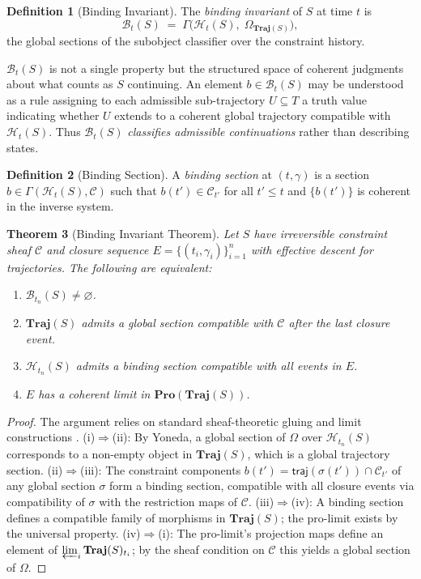\documentclass[11pt, letterpaper]{article}
\theoremstyle{plain}
\newtheorem{theorem}{Theorem}[section]
\theoremstyle{definition}
\newtheorem{definition}[theorem]{Definition}
\theoremstyle{remark}
\newcommand{\BI}{\mathcal{B}}
\newcommand{\CC}{\mathcal{C}}
\newcommand{\HH}{\mathcal{H}}
\newcommand{\traj}{\mathsf{traj}}
\begin{document}
\begin{definition}[Binding Invariant]
The \emph{binding invariant} of $S$ at time $t$ is
\[
  \BI_t(S) \;=\; \Gamma\!\bigl(\HH_t(S),\;\Omega_{\mathbf{Traj}(S)}\bigr),
\]
the global sections of the subobject classifier over the constraint history.
\end{definition}

$\BI_t(S)$ is not a single property but the structured space of coherent judgments
about what counts as $S$ continuing. An element $b \in \BI_t(S)$ may be understood
as a rule assigning to each admissible sub-trajectory $U \subseteq T$ a truth value
indicating whether $U$ extends to a coherent global trajectory compatible with
$\HH_t(S)$. Thus $\BI_t(S)$ \emph{classifies admissible continuations} rather than
describing states.

\begin{definition}[Binding Section]
A \emph{binding section} at $(t, \gamma)$ is a section
$b \in \Gamma(\HH_t(S), \CC)$ such that $b(t') \in \CC_{t'}$ for all $t' \leq t$
and $\{b(t')\}$ is coherent in the inverse system.
\end{definition}

\begin{theorem}[Binding Invariant Theorem]
\label{thm:bi}
Let $S$ have irreversible constraint sheaf $\CC$ and closure sequence
$E = \{(t_i, \gamma_i)\}_{i=1}^n$ with effective descent for trajectories. The
following are equivalent:
\begin{enumerate}[label=(\roman*), noitemsep]
  \item $\BI_{t_n}(S) \neq \varnothing$.
  \item $\mathbf{Traj}(S)$ admits a global section compatible with $\CC$ after the
    last closure event.
  \item $\HH_{t_n}(S)$ admits a binding section compatible with all events in $E$.
  \item $E$ has a coherent limit in $\mathbf{Pro}(\mathbf{Traj}(S))$.
\end{enumerate}
\end{theorem}

\begin{proof}
The argument relies on standard sheaf-theoretic gluing and limit constructions
\cite{maclane,riehl}. (i)$\Rightarrow$(ii): By Yoneda, a global section of $\Omega$
over $\HH_{t_n}(S)$ corresponds to a non-empty object in $\mathbf{Traj}(S)$, which is
a global trajectory section. (ii)$\Rightarrow$(iii): The constraint components
$b(t') = \traj(\sigma(t')) \cap \CC_{t'}$ of any global section $\sigma$ form a
binding section, compatible with all closure events via compatibility of $\sigma$ with
the restriction maps of $\CC$. (iii)$\Rightarrow$(iv): A binding section defines a
compatible family of morphisms in $\mathbf{Traj}(S)$; the pro-limit exists by the
universal property. (iv)$\Rightarrow$(i): The pro-limit's projection maps define an
element of $\varprojlim_i \mathbf{Traj}(S)_{t_i}$; by the sheaf condition on $\CC$
this yields a global section of $\Omega$.
\end{proof}
\end{document}
